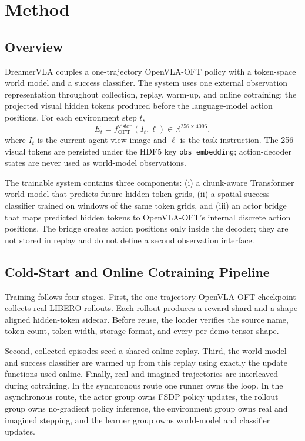 \section{Method}

\subsection{Overview}

DreamerVLA couples a one-trajectory OpenVLA-OFT policy with a token-space
world model and a success classifier.  The system uses one external observation
representation throughout collection, replay, warm-up, and online cotraining:
the projected visual hidden tokens produced before the language-model action
positions.  For each environment step $t$,
\[
E_t = f_{\mathrm{OFT}}^{\mathrm{vision}}(I_t,\ell)
    \in \mathbb{R}^{256\times4096},
\]
where $I_t$ is the current agent-view image and $\ell$ is the task instruction.
The 256 visual tokens are persisted under the HDF5 key
\texttt{obs\_embedding}; action-decoder states are never used as world-model
observations.

The trainable system contains three components: (i) a chunk-aware Transformer
world model that predicts future hidden-token grids, (ii) a spatial success
classifier trained on windows of the same token grids, and (iii) an actor bridge
that maps predicted hidden tokens to OpenVLA-OFT's internal discrete action
positions.  The bridge creates action positions only inside the decoder; they
are not stored in replay and do not define a second observation interface.

\subsection{Cold-Start and Online Cotraining Pipeline}

Training follows four stages.  First, the one-trajectory OpenVLA-OFT checkpoint
collects real LIBERO rollouts.  Each rollout produces a reward shard and a
shape-aligned hidden-token sidecar.  Before reuse, the loader verifies the source
name, token count, token width, storage format, and every per-demo tensor shape.

Second, collected episodes seed a shared online replay.  Third, the world model
and success classifier are warmed up from this replay using exactly the update
functions used online.  Finally, real and imagined trajectories are interleaved
during cotraining.  In the synchronous route one runner owns the loop.  In the
asynchronous route, the actor group owns FSDP policy updates, the rollout group
owns no-gradient policy inference, the environment group owns real and imagined
stepping, and the learner group owns world-model and classifier updates.

